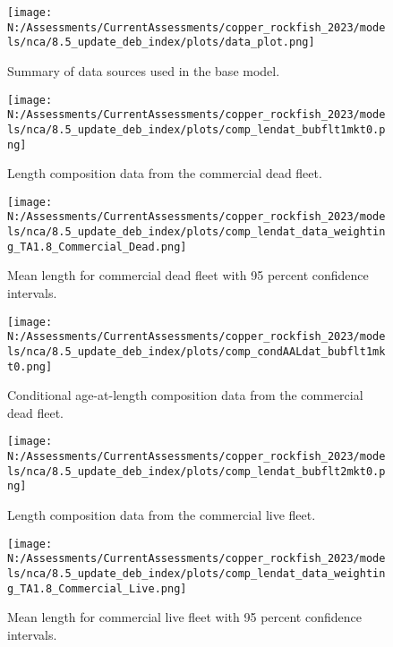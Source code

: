 \documentclass[11pt,
  english,
  letterpaper,
]{article}
\begin{document}
\begin{figure}
\centering
\texttt{[image: N:/Assessments/CurrentAssessments/copper\_rockfish\_2023/models/nca/8.5\_update\_deb\_index/plots/data\_plot.png]}
\caption{Summary of data sources used in the base model.\label{fig:data-plot}}
\end{figure}

\begin{figure}
\centering
\texttt{[image: N:/Assessments/CurrentAssessments/copper\_rockfish\_2023/models/nca/8.5\_update\_deb\_index/plots/comp\_lendat\_bubflt1mkt0.png]}
\caption{Length composition data from the commercial dead fleet.\label{fig:com-dead-len-data}}
\end{figure}

\begin{figure}
\centering
\texttt{[image: N:/Assessments/CurrentAssessments/copper\_rockfish\_2023/models/nca/8.5\_update\_deb\_index/plots/comp\_lendat\_data\_weighting\_TA1.8\_Commercial\_Dead.png]}
\caption{Mean length for commercial dead fleet with 95 percent confidence intervals.\label{fig:mean-com-dead-len-data}}
\end{figure}

\begin{figure}
\centering
\texttt{[image: N:/Assessments/CurrentAssessments/copper\_rockfish\_2023/models/nca/8.5\_update\_deb\_index/plots/comp\_condAALdat\_bubflt1mkt0.png]}
\caption{Conditional age-at-length composition data from the commercial dead fleet.\label{fig:com-dead-age-data}}
\end{figure}

\begin{figure}
\centering
\texttt{[image: N:/Assessments/CurrentAssessments/copper\_rockfish\_2023/models/nca/8.5\_update\_deb\_index/plots/comp\_lendat\_bubflt2mkt0.png]}
\caption{Length composition data from the commercial live fleet.\label{fig:com-live-len-data}}
\end{figure}

\begin{figure}
\centering
\texttt{[image: N:/Assessments/CurrentAssessments/copper\_rockfish\_2023/models/nca/8.5\_update\_deb\_index/plots/comp\_lendat\_data\_weighting\_TA1.8\_Commercial\_Live.png]}
\caption{Mean length for commercial live fleet with 95 percent confidence intervals.\label{fig:mean-com-live-len-data}}
\end{figure}
\end{document}
